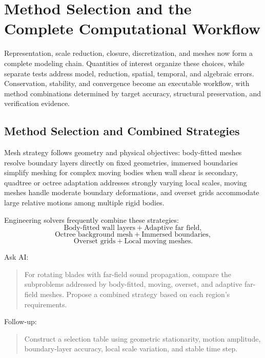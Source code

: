 \chapter{Method Selection and the Complete Computational Workflow}\label{ch:22}
\begin{chaptersummary}
Representation, scale reduction, closure, discretization, and meshes now form a complete modeling chain. Quantities of interest organize these choices, while separate tests address model, reduction, spatial, temporal, and algebraic errors. Conservation, stability, and convergence become an executable workflow, with method combinations determined by target accuracy, structural preservation, and verification evidence.
\end{chaptersummary}
\section{Method Selection and Combined Strategies}
Mesh strategy follows geometry and physical objectives: body-fitted meshes resolve boundary layers directly on fixed geometries, immersed boundaries simplify meshing for complex moving bodies when wall shear is secondary, quadtree or octree adaptation addresses strongly varying local scales, moving meshes handle moderate boundary deformations, and overset grids accommodate large relative motions among multiple rigid bodies.

Engineering solvers frequently combine these strategies:
\[
\text{Body-fitted wall layers}
+
\text{Adaptive far field},
\]
\[
\text{Octree background mesh}
+
\text{Immersed boundaries},
\]
\[
\text{Overset grids}
+
\text{Local moving meshes}.
\]

\begin{askai}
Ask AI:
\begin{quote}
For rotating blades with far-field sound propagation, compare the subproblems addressed by body-fitted, moving, overset, and adaptive far-field meshes. Propose a combined strategy based on each region's requirements.
\end{quote}

Follow-up:
\begin{quote}
Construct a selection table using geometric stationarity, motion amplitude, boundary-layer accuracy, local scale variation, and stable time step.
\end{quote}
\end{askai}

